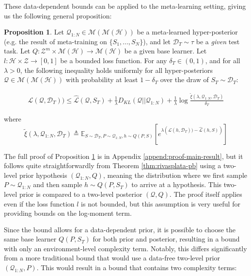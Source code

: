 \documentclass{article}
\theoremstyle{definition}
\newtheorem{proposition}{Proposition}[section]
\newcommand{\Expect}[2]{\mathbb{E}_{#1}\left [#2 \right ]}
\begin{document}
These data-dependent bounds can be applied to the meta-learning setting, giving us the following general proposition:

\begin{proposition} \label{thm:main-result}
	Let $\mathcal{Q}_{1:N}\in \mathcal{M}(\mathcal{M}(\mathcal{H}))$ be a meta-learned hyper-posterior (e.g. the result of meta-training on $\{S_1,...,S_N\}$), and let $\mathcal{D}_T\sim \tau$ be a \emph{given} test task. Let $Q: \mathcal{Z}^m\times\mathcal{M}(\mathcal{H})\rightarrow \mathcal{M}(\mathcal{H})$ be a given base learner. Let $l: \mathcal{H}\times \mathcal{Z}\rightarrow [0, 1]$ be a bounded loss function.
	For any $\delta_T \in (0,1)$, and for all $\lambda>0$, the following inequality holds uniformly for all hyper-posteriors $\mathcal{Q}\in \mathcal{M}(\mathcal{M}(\mathcal{H}))$ with probability at least $1-\delta_T$ over the draw of $S_T\sim \mathcal{D}_T$:
	
	\begin{align} \label{eq:main-result-generic}
	\mathcal{L}(\mathcal{Q}, \mathcal{D}_T)) \leq \hat{\mathcal{L}}(\mathcal{Q}, S_T) + \frac{1}{\lambda}D_{KL}(\mathcal{Q}||\mathcal{Q}_{1:N})
	+\frac{1}{\lambda}\log\frac{\tilde{\xi}(\lambda,\mathcal{Q}_{1:N},\mathcal{D}_T)}{\delta_T}
	\end{align}
	
	
	where 
	$$\tilde{\xi}(\lambda,\mathcal{Q}_{1:N},\mathcal{D}_T)\triangleq \Expect{S\sim \mathcal{D}_T, P\sim \mathcal{Q}_{1:N}, h\sim Q(P,S)}{e^{\lambda\left (\mathcal{L}(h, \mathcal{D}_T))-\hat{\mathcal{L}}(h, S)\right )}}$$
\end{proposition}

The full proof of Proposition \ref{thm:main-result} is in Appendix \ref{append:proof-main-result}, but it follows quite straightforwardly from Theorem \ref{thm:rivasplata-pb} using a two-level prior hypothesis $(\mathcal{Q}_{1:N}, Q)$, meaning the distribution where we first sample $P\sim \mathcal{Q}_{1:N}$ and then sample $h\sim Q(P, S_T)$ to arrive at a hypothesis. This two-level prior is compared to a two-level posterior $(\mathcal{Q}, Q)$. The proof itself applies even if the loss function $l$ is not bounded, but this assumption is very useful for providing bounds on the log-moment term.

Since the bound allows for a data-dependent prior, it is possible to choose the same base learner $Q(P, S_T)$ for both prior and posterior, resulting in a bound with only an environment-level complexity term. 
Notably, this differs significantly from a more traditional bound that would use a data-free two-level prior $(\mathcal{Q}_{1:N}, P)$. This would result in a bound that contains two complexity terms:
\end{document}
